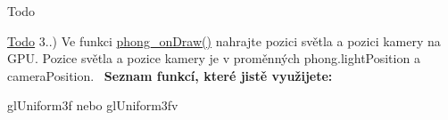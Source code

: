 \begin{DoxyRefDesc}{Todo}
\item[\hyperlink{todo__todo000010}{Todo}]3..) Ve funkci \hyperlink{student_8h_a53ffbb1a271d285abdaf7a029192f47e}{phong\+\_\+on\+Draw()} nahrajte pozici světla a pozici kamery na G\+P\+U. Pozice světla a pozice kamery je v proměnných phong.\+light\+Position a camera\+Position.~\newline
 {\bfseries Seznam funkcí, které jistě využijete\+:}
\begin{DoxyItemize}
\item gl\+Uniform3f nebo gl\+Uniform3fv 
\end{DoxyItemize}\end{DoxyRefDesc}
